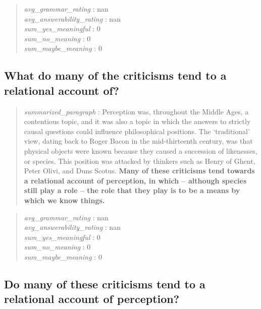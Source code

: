 \begin{quote}
\emph{avg\_grammar\_rating} : nan\\
\emph{avg\_answerability\_rating} : nan\\
\emph{sum\_yes\_meaningful} : 0\\
\emph{sum\_no\_meaning} : 0\\
\emph{sum\_maybe\_meaning} : 0
\end{quote}

\hypertarget{what-do-many-of-the-criticisms-tend-to-a-relational-account-of}{%
\subsection{What do many of the criticisms tend to a relational account
of?}\label{what-do-many-of-the-criticisms-tend-to-a-relational-account-of}}

\begin{quote}
\emph{summarized\_paragraph} : Perception was, throughout the Middle
Ages, a contentious topic, and it was also a topic in which the answers
to strictly causal questions could influence philosophical positions.
The `traditional' view, dating back to Roger Bacon in the mid-thirteenth
century, was that physical objects were known because they caused a
succession of likenesses, or species. This position was attacked by
thinkers such as Henry of Ghent, Peter Olivi, and Duns Scotus.
\textbf{Many of these criticisms tend towards a relational account of
perception, in which -- although species still play a role -- the role
that they play is to be a means by which we know things.}
\end{quote}

\begin{quote}
\emph{avg\_grammar\_rating} : nan\\
\emph{avg\_answerability\_rating} : nan\\
\emph{sum\_yes\_meaningful} : 0\\
\emph{sum\_no\_meaning} : 0\\
\emph{sum\_maybe\_meaning} : 0
\end{quote}

\hypertarget{do-many-of-these-criticisms-tend-to-a-relational-account-of-perception}{%
\subsection{Do many of these criticisms tend to a relational account of
perception?}\label{do-many-of-these-criticisms-tend-to-a-relational-account-of-perception}}

